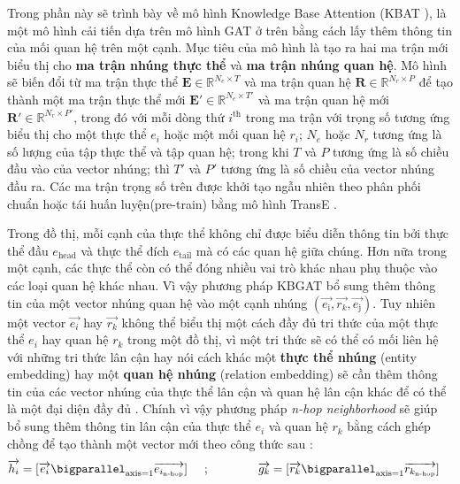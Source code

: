 Trong phần này sẽ trình bày về mô hình Knowledge Base Attention (KBAT \cite{nathani2019learning}), là một mô hình cải tiến dựa trên mô hình GAT ở trên bằng cách lấy thêm thông tin của mối quan hệ trên một cạnh. Mục tiêu của mô hình là tạo ra hai ma trận mới biểu thị cho \textbf{ma trận nhúng thực thể} và \textbf{ma trận nhúng quan hệ}. Mô hình sẽ biến đổi từ ma trận thực thể $\mathbf{E} \in \mathbb{R}^{N_e \times T}$ và ma trận quan hệ $\mathbf{R} \in \mathbb{R}^{N_r \times P}$ để tạo thành một ma trận thực thể mới $\mathbf{E'} \in \mathbb{R}^{N_e \times T'}$ và ma trận quan hệ mới $\mathbf{R'} \in \mathbb{R}^{N_r \times P'}$, trong đó với mỗi dòng thứ $i^{\text{th}}$ trong ma trận với trọng số tương ứng biểu thị cho một thực thể $e_i$ hoặc một mối quan hệ $r_i$; $N_e$ hoặc $N_r$ tương ứng là số lượng của tập thực thể và tập quan hệ; trong khi $T$ và $P$ tương ứng là số chiều đầu vào của vector nhúng; thì $T'$ và $P'$ tương ứng là số chiều của vector nhúng đầu ra. Các ma trận trọng số trên được khởi tạo ngẫu nhiên theo phân phối chuẩn hoặc tái huấn luyện(pre-train) bằng mô hình TransE \cite{bordes2013translating} .

Trong đồ thị, mỗi cạnh của thực thể không chỉ được biểu diễn thông tin bởi thực thể đầu $e_\text{head}$ và thực thể đích $e_\text{tail}$ mà có các quan hệ giữa chúng. Hơn nữa trong một cạnh, các thực thể còn có thể đóng nhiều vai trò khác nhau phụ thuộc vào các loại quan hệ khác nhau. Vì vậy phương pháp KBGAT bổ sung thêm thông tin của một vector nhúng quan hệ vào một cạnh  nhúng $(\overrightarrow{e_\text{i}}, \overrightarrow{r_k}, \overrightarrow{e_\text{j}})$. Tuy nhiên một vector $\overrightarrow{e_i}$ hay $\overrightarrow{r_k}$ không thể biểu thị một cách đầy đủ tri thức của một thực thể $e_i$ hay quan hệ $r_k$ trong một đồ thị, vì một tri thức sẽ có thể có mối liên hệ với những tri thức lân cận hay nói cách khác một \textbf{thực thể nhúng} (entity embedding) hay một \textbf{quan hệ nhúng} (relation embedding) sẽ cần thêm thông tin của các vector nhúng của thực thể lân cận và quan hệ lân cận khác để có thể là một đại diện đầy đủ . Chính vì vậy phương pháp \textit{n-hop neighborhood} \cite{lin2018multi} sẽ giúp bổ sung thêm thông tin lân cận của thực thể $e_i$ và quan hệ $r_k$ bằng cách ghép chồng để tạo thành một vector mới theo công thức sau :
\begin{align}
{\overrightarrow{h_i} = [\overrightarrow{e_i} \bigparallel_{\text{axis}=1} \overrightarrow{e_{i_{\text{n-hop}}}}]} \hspace{0.5cm};\hspace{1.5cm}&
{\overrightarrow{g_k} = [\overrightarrow{r_k} \bigparallel_{\text{axis}=1} \overrightarrow{r_{k_{\text{n-hop}}}}]}
\end{align}

